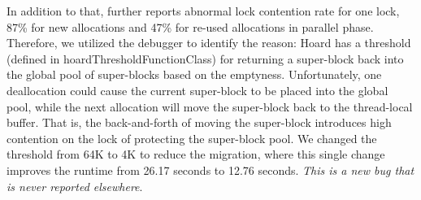 In addition to that, \MP{} further reports abnormal lock contention rate for one lock, 87\% for new allocations and 47\% for re-used allocations in parallel phase. Therefore, we utilized the debugger to identify the reason: Hoard has a threshold (defined in hoardThresholdFunctionClass) for returning a super-block back into the global pool of super-blocks based on the emptyness. Unfortunately, one deallocation could cause the current super-block to be placed into the global pool, while the next allocation will move the super-block back to the thread-local buffer. That is, the back-and-forth of moving the super-block introduces high contention on the lock of protecting the super-block pool. We changed the threshold from 64K to 4K to reduce the migration, where this single change improves the runtime from 26.17 seconds to 12.76 seconds. \textit{This is a new bug that is never reported elsewhere}. 


 


